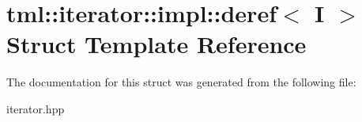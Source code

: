\hypertarget{structtml_1_1iterator_1_1impl_1_1deref}{\section{tml\+:\+:iterator\+:\+:impl\+:\+:deref$<$ I $>$ Struct Template Reference}
\label{structtml_1_1iterator_1_1impl_1_1deref}
}


The documentation for this struct was generated from the following file\+:\begin{DoxyCompactItemize}
\item 
iterator.\+hpp\end{DoxyCompactItemize}
